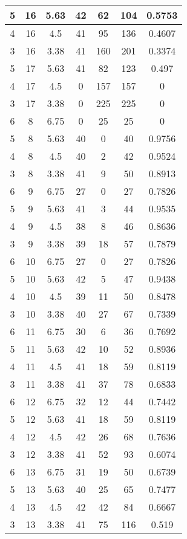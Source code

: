 \documentclass[letterpaper, 12pt]{article}
\begin{document}
\begin{longtable}{|c|c|c|c|c|c|c|}
\hline
5 & 16 & 5.63 & 42 & 62 & 104 & 0.5753 \\
\hline
4 & 16 & 4.5 & 41 & 95 & 136 & 0.4607 \\
\hline
3 & 16 & 3.38 & 41 & 160 & 201 & 0.3374 \\
\hline
5 & 17 & 5.63 & 41 & 82 & 123 & 0.497 \\
\hline
4 & 17 & 4.5 & 0 & 157 & 157 & 0 \\
\hline
3 & 17 & 3.38 & 0 & 225 & 225 & 0 \\
\hline
6 & 8 & 6.75 & 0 & 25 & 25 & 0 \\
\hline
5 & 8 & 5.63 & 40 & 0 & 40 & 0.9756 \\
\hline
4 & 8 & 4.5 & 40 & 2 & 42 & 0.9524 \\
\hline
3 & 8 & 3.38 & 41 & 9 & 50 & 0.8913 \\
\hline
6 & 9 & 6.75 & 27 & 0 & 27 & 0.7826 \\
\hline
5 & 9 & 5.63 & 41 & 3 & 44 & 0.9535 \\
\hline
4 & 9 & 4.5 & 38 & 8 & 46 & 0.8636 \\
\hline
3 & 9 & 3.38 & 39 & 18 & 57 & 0.7879 \\
\hline
6 & 10 & 6.75 & 27 & 0 & 27 & 0.7826 \\
\hline
5 & 10 & 5.63 & 42 & 5 & 47 & 0.9438 \\
\hline
4 & 10 & 4.5 & 39 & 11 & 50 & 0.8478 \\
\hline
3 & 10 & 3.38 & 40 & 27 & 67 & 0.7339 \\
\hline
6 & 11 & 6.75 & 30 & 6 & 36 & 0.7692 \\
\hline
5 & 11 & 5.63 & 42 & 10 & 52 & 0.8936 \\
\hline
4 & 11 & 4.5 & 41 & 18 & 59 & 0.8119 \\
\hline
3 & 11 & 3.38 & 41 & 37 & 78 & 0.6833 \\
\hline
6 & 12 & 6.75 & 32 & 12 & 44 & 0.7442 \\
\hline
5 & 12 & 5.63 & 41 & 18 & 59 & 0.8119 \\
\hline
4 & 12 & 4.5 & 42 & 26 & 68 & 0.7636 \\
\hline
3 & 12 & 3.38 & 41 & 52 & 93 & 0.6074 \\
\hline
6 & 13 & 6.75 & 31 & 19 & 50 & 0.6739 \\
\hline
5 & 13 & 5.63 & 40 & 25 & 65 & 0.7477 \\
\hline
4 & 13 & 4.5 & 42 & 42 & 84 & 0.6667 \\
\hline
3 & 13 & 3.38 & 41 & 75 & 116 & 0.519 \\

\end{longtable}
\end{document}
